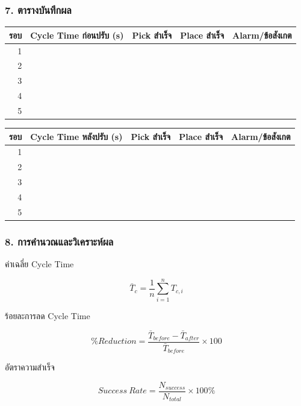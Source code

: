 \subsubsection{7. ตารางบันทึกผล}

\begin{table}[htbp]
    \centering
    \begin{tabular}{r r l l l}
        \hline
        \textbf{รอบ} & \textbf{Cycle Time ก่อนปรับ (s)} & \textbf{Pick สำเร็จ} & \textbf{Place สำเร็จ} & \textbf{Alarm/ข้อสังเกต} \\
        \hline
        1 &  &  &  &  \\
        2 &  &  &  &  \\
        3 &  &  &  &  \\
        4 &  &  &  &  \\
        5 &  &  &  &  \\
        \hline
    \end{tabular}
\end{table}

\begin{table}[htbp]
    \centering
    \begin{tabular}{r r l l l}
        \hline
        \textbf{รอบ} & \textbf{Cycle Time หลังปรับ (s)} & \textbf{Pick สำเร็จ} & \textbf{Place สำเร็จ} & \textbf{Alarm/ข้อสังเกต} \\
        \hline
        1 &  &  &  &  \\
        2 &  &  &  &  \\
        3 &  &  &  &  \\
        4 &  &  &  &  \\
        5 &  &  &  &  \\
        \hline
    \end{tabular}
\end{table}

\subsubsection{8. การคำนวณและวิเคราะห์ผล}

ค่าเฉลี่ย Cycle Time

\[
\bar{T}_c=\frac{1}{n}\sum_{i=1}^{n}T_{c,i}
\]

ร้อยละการลด Cycle Time

\[
\%Reduction=\frac{\bar{T}_{before}-\bar{T}_{after}}{\bar{T}_{before}}\times100
\]

อัตราความสำเร็จ

\[
Success\ Rate=\frac{N_{success}}{N_{total}}\times100\%
\]


